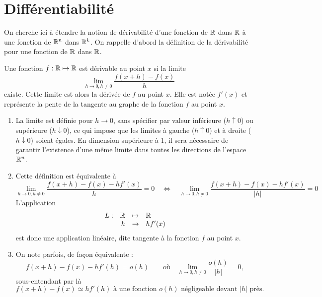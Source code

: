 \section{Différentiabilité} \label{sec:Multivar-Diff}


On cherche ici à étendre la notion de dérivabilité d'une fonction de $\mathbb{R}$ dans $\mathbb{R}$ à une fonction de $\mathbb{R}^n$ dans $\mathbb{R}^k$. On rappelle d'abord la définition de la dérivabilité pour une fonction de $\mathbb{R}$ dans $\mathbb{R}$.

\begin{definition*}[Dérivabilité]
  Une fonction $f: \mathbb{R} \mapsto \mathbb{R}$ est dérivable au point $x$ si la limite
  $$
  \lim_{h \rightarrow 0, h \neq 0} \frac{f(x+h) - f(x)}{h}
  $$
  existe. Cette limite est alors la dérivée de $f$ au point $x$. Elle est notée $f'(x)$ et représente la pente de la tangente au graphe de la fonction $f$ au point $x$.
\end{definition*}

\remarks
\begin{enumerate}
  \item La limite est définie pour $h \rightarrow 0$, sans spécifier par valeur inférieure ($h \uparrow 0$) ou supérieure ($h \downarrow 0$), ce qui impose que les limites à gauche ($h \uparrow 0$) et à droite ($h \downarrow 0$) soient égales. En dimension supérieure à 1, il sera nécessaire de garantir l'existence d'une même limite dans toutes les directions de l'espace $\mathbb{R}^n$.
  \item Cette définition est équivalente à
  $$
  \lim_{h\rightarrow 0, h \neq 0} \frac{f(x+h) - f(x) - hf'(x)}{h} = 0
  \quad \Leftrightarrow \quad 
  \lim_{h\rightarrow 0, h \neq 0} \frac{f(x+h) - f(x) - hf'(x)}{|h|} = 0
  $$
  L'application 
  $$
  \begin{array}{rrcl}
    L :  & \mathbb{R} & \mapsto & \mathbb{R} \\
    & h & \rightarrow &  hf'(x)
  \end{array}
  $$
  est donc une application linéaire, dite tangente à la fonction $f$ au point $x$.
  \item On note parfois, de façon équivalente :
  $$
  f(x+h) - f(x) - h f'(h) = o(h)
  \qquad \text{où} \quad
  \lim_{h\rightarrow 0, h \neq 0} \frac{o(h)}{|h|} = 0,
  $$
  sous-entendant par là 
  $$
  \text{$f(x+h) - f(x) \simeq h f'(h)$ à une fonction $o(h)$ négligeable devant $|h|$ près.}
  $$
\end{enumerate}

